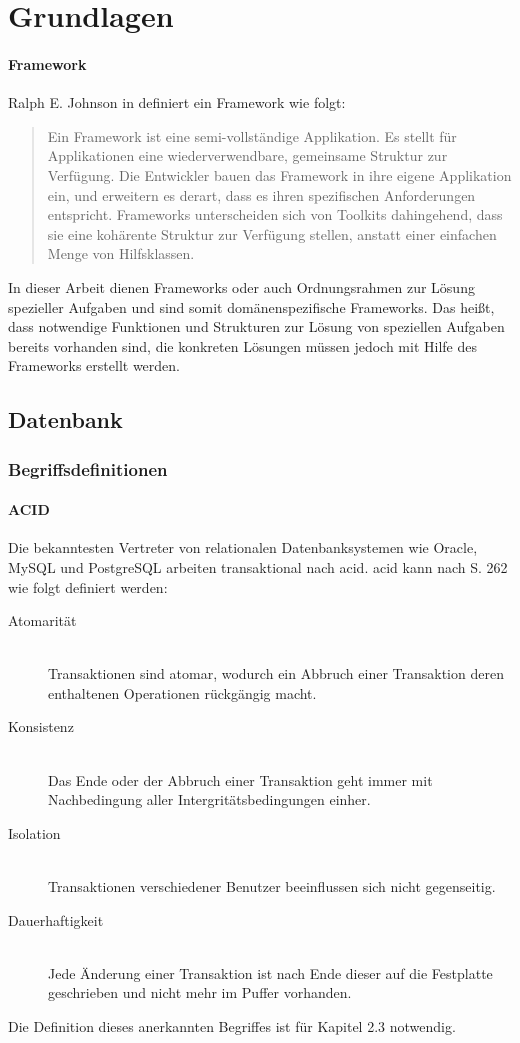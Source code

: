 \chapter{Grundlagen}

\subsubsection{Framework}
Ralph E. Johnson in \cite{website:wiki-framework} definiert ein Framework wie folgt:
\begin{quote}
Ein Framework ist eine semi-vollständige Applikation. Es stellt für Applikationen eine wiederverwendbare, gemeinsame Struktur zur Verfügung. Die Entwickler bauen das Framework in ihre eigene Applikation ein, und erweitern es derart, dass es ihren spezifischen Anforderungen entspricht. Frameworks unterscheiden sich von Toolkits dahingehend, dass sie eine kohärente Struktur zur Verfügung stellen, anstatt einer einfachen Menge von Hilfsklassen.
\end{quote}
In dieser Arbeit dienen Frameworks oder auch Ordnungsrahmen zur Lösung spezieller Aufgaben und sind somit domänenspezifische Frameworks.
Das heißt, dass notwendige Funktionen und Strukturen zur Lösung von speziellen Aufgaben bereits vorhanden sind, die konkreten Lösungen müssen jedoch mit Hilfe des Frameworks erstellt werden.


\section{Datenbank}

\subsection{Begriffsdefinitionen}

\subsubsection{ACID}
Die bekanntesten Vertreter von relationalen Datenbanksystemen wie Oracle, MySQL und PostgreSQL arbeiten transaktional nach \Gls{acid}.
\Gls{acid} kann nach \cite{book:kudrass} S. 262 wie folgt definiert werden:
\begin{description}
\item[Atomarität] \hfill \\
Transaktionen sind atomar, wodurch ein Abbruch einer Transaktion deren enthaltenen Operationen rückgängig macht.
\item[Konsistenz] \hfill \\
Das Ende oder der Abbruch einer Transaktion geht immer mit Nachbedingung aller Intergritätsbedingungen einher.
\item[Isolation] \hfill \\
Transaktionen verschiedener Benutzer beeinflussen sich nicht gegenseitig.
\item[Dauerhaftigkeit] \hfill \\
Jede Änderung einer Transaktion ist nach Ende dieser auf die Festplatte geschrieben und nicht mehr im Puffer vorhanden.
\end{description}
Die Definition dieses anerkannten Begriffes ist für Kapitel 2.3 notwendig.

